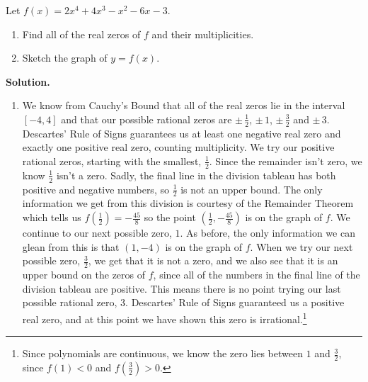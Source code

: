 \begin{ex}  Let $f(x) = 2x^4+4x^3-x^2-6x-3$.

\begin{enumerate}

\item  Find all of the real zeros of $f$ and their multiplicities.

\item Sketch the graph of $y=f(x)$.

\end{enumerate}  

{\bf Solution.}  \begin{enumerate}

\item  We know from Cauchy's Bound that all of the real zeros lie in the interval $[-4,4]$ and that our possible rational zeros are $\pm \, \frac{1}{2}$, $\pm \, 1$, $\pm \, \frac{3}{2}$ and $\pm \, 3$.  Descartes' Rule of Signs guarantees us at least one negative real zero and exactly one positive real zero, counting multiplicity.  We try our positive rational zeros, starting with the smallest, $\frac{1}{2}$.  Since the remainder isn't zero, we know $\frac{1}{2}$ isn't a zero.  Sadly, the final line in the division tableau has both positive and negative numbers, so $\frac{1}{2}$ is not an upper bound.  The only information we get from this division is courtesy of the Remainder Theorem which tells us $f\left(\frac{1}{2}\right) =  -\frac{45}{8}$ so the point $\left(\frac{1}{2}, -\frac{45}{8}\right)$ is on the graph of $f$.  We continue to our next possible zero, $1$.  As before, the only information we can glean from this is that $(1,-4)$ is on the graph of $f$.  When we try our next possible zero, $\frac{3}{2}$, we get that it is not a zero, and we also see that it is an upper bound on the zeros of $f$, since all of the numbers in the final line of the division tableau are positive.  This means there is no point trying our last possible rational zero, $3$.  Descartes' Rule of Signs guaranteed us a positive real zero, and at this point we have shown this zero is irrational.\footnote{Since polynomials are continuous, we know the zero lies between $1$ and $\frac{3}{2}$, since $f(1) < 0$ and $f\left(\frac{3}{2}\right) > 0$.}

 
\end{enumerate}
\end{ex}
